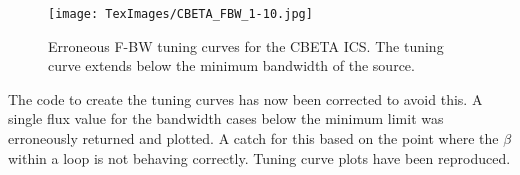 \documentclass[10pt]{article}
\begin{document}
\begin{figure}[H]
\centering
\texttt{[image: TexImages/CBETA\_FBW\_1-10.jpg]}
\caption{Erroneous F-BW tuning curves for the CBETA ICS. The tuning curve extends below the minimum bandwidth of the source.}
\label{fig:CBETAerrtun}
\end{figure}

The code to create the tuning curves has now been corrected to avoid this. A single flux value for the bandwidth cases below the minimum limit was erroneously returned and plotted. A catch for this based on the point where the $\beta$  within a loop is not behaving correctly. Tuning curve plots have been reproduced.

\newpage


\end{document}
